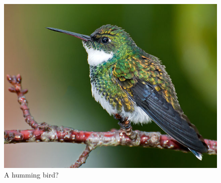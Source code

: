 \documentclass{article}
\begin{document}
\begin{figure}[h]
	\centering
	\includegraphics[scale=1]{bird.jpg}
	\caption{A humming bird?}
	\label{bird}
\end{figure}

\end{document}
